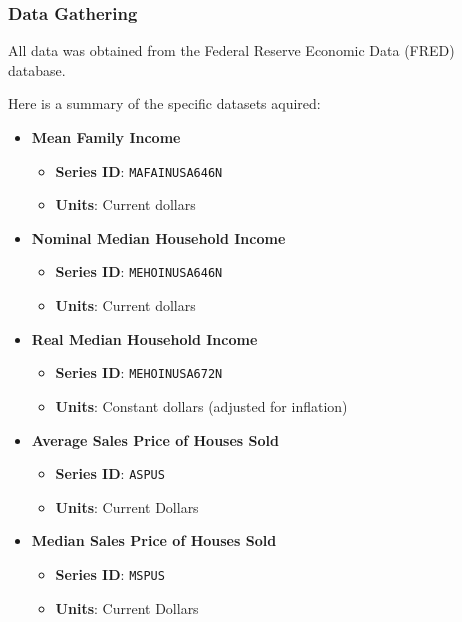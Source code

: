 \documentclass{article}
\begin{document}
\subsubsection{Data Gathering}

All data was obtained from the Federal Reserve Economic Data (FRED) database. 

Here is a summary of the specific datasets aquired:

\begin{itemize} 
    
    \item \textbf{Mean Family Income} 
    \begin{itemize} 
      \item \textbf{Series ID}: \texttt{MAFAINUSA646N} 
      \item \textbf{Units}: Current dollars 
    \end{itemize}
  
    \item \textbf{Nominal Median Household Income} 
    \begin{itemize} 
      \item \textbf{Series ID}: \texttt{MEHOINUSA646N} 
      \item \textbf{Units}: Current dollars 
    \end{itemize}

    \item \textbf{Real Median Household Income}
    \begin{itemize}
        \item \textbf{Series ID}: \texttt{MEHOINUSA672N}
        \item \textbf{Units}: Constant dollars (adjusted for inflation)
    \end{itemize}

    \item \textbf{Average Sales Price of Houses Sold}
    \begin{itemize}
        \item \textbf{Series ID}: \texttt{ASPUS}
        \item \textbf{Units}: Current Dollars
    \end{itemize}

    \item \textbf{Median Sales Price of Houses Sold}
    \begin{itemize}
        \item \textbf{Series ID}: \texttt{MSPUS}
        \item \textbf{Units}: Current Dollars
    \end{itemize}


\end{itemize}
\end{document}
